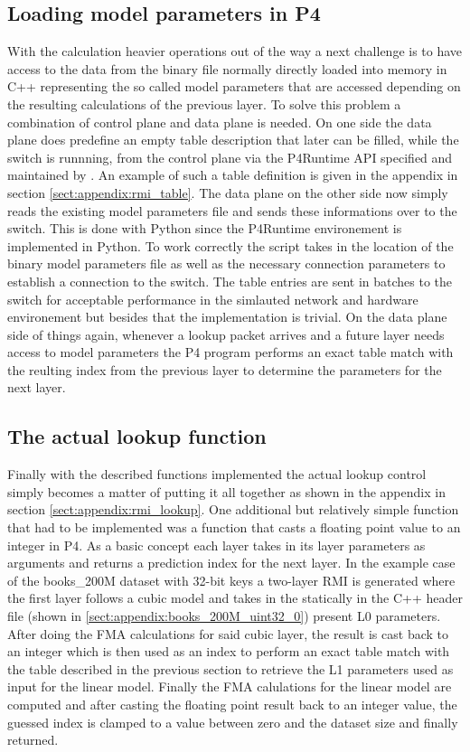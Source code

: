 \subsection{Loading model parameters in P4}
With the calculation heavier operations out of the way a next challenge is to have access to the data from the binary file normally directly loaded into memory in C++ representing the so called model parameters that are accessed depending on the resulting calculations of the previous layer. To solve this problem a combination of control plane and data plane is needed. On one side the data plane does predefine an empty table description that later can be filled, while the switch is runnning, from the control plane via the P4Runtime API specified and maintained by \cite{p4runtime-spec}. An example of such a table definition is given in the appendix in section \ref{sect:appendix:rmi_table}. The data plane on the other side now simply reads the existing model parameters file and sends these informations over to the switch. This is done with Python since the P4Runtime environement is implemented in Python. To work correctly the script takes in the location of the binary model parameters file as well as the necessary connection parameters to establish a connection to the switch. The table entries are sent in batches to the switch for acceptable performance in the simlauted network and hardware environement but besides that the implementation is trivial. On the data plane side of things again, whenever a lookup packet arrives and a future layer needs access to model parameters the P4 program performs an exact table match with the reulting index from the previous layer to determine the parameters for the next layer.

\subsection{The actual lookup function}
Finally with the described functions implemented the actual lookup control simply becomes a matter of putting it all together as shown in the appendix in section \ref{sect:appendix:rmi_lookup}. One additional but relatively simple function that had to be implemented was a function that casts a floating point value to an integer in P4. As a basic concept each layer takes in its layer parameters as arguments and returns a prediction index for the next layer. In the example case of the books\_200M dataset with 32-bit keys a two-layer RMI is generated where the first layer follows a cubic model and takes in the statically in the C++ header file (shown in \ref{sect:appendix:books_200M_uint32_0}) present L0 parameters. After doing the FMA calculations for said cubic layer, the result is cast back to an integer which is then used as an index to perform an exact table match with the table described in the previous section to retrieve the L1 parameters used as input for the linear model. Finally the FMA calulations for the linear model are computed and after casting the floating point result back to an integer value, the guessed index is clamped to a value between zero and the dataset size and finally returned.

